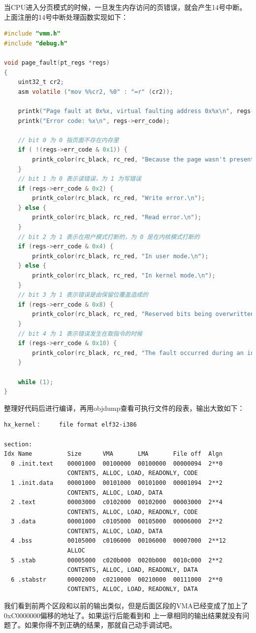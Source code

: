 \par 当CPU进入分页模式的时候，一旦发生内存访问的页错误，就会产生14号中断。上面注册的14号中断处理函数实现如下：

\begin{lstlisting}[language = C, caption = mm/page\_fault.c]
#include "vmm.h"
#include "debug.h"

void page_fault(pt_regs *regs)
{
	uint32_t cr2;
	asm volatile ("mov %%cr2, %0" : "=r" (cr2));

	printk("Page fault at 0x%x, virtual faulting address 0x%x\n", regs->eip, cr2);
	printk("Error code: %x\n", regs->err_code);

	// bit 0 为 0 指页面不存在内存里
	if ( !(regs->err_code & 0x1)) {
		printk_color(rc_black, rc_red, "Because the page wasn't present.\n");
	}
	// bit 1 为 0 表示读错误，为 1 为写错误
	if (regs->err_code & 0x2) {
		printk_color(rc_black, rc_red, "Write error.\n");
	} else {
		printk_color(rc_black, rc_red, "Read error.\n");
	}
	// bit 2 为 1 表示在用户模式打断的，为 0 是在内核模式打断的
	if (regs->err_code & 0x4) {
		printk_color(rc_black, rc_red, "In user mode.\n");
	} else {
		printk_color(rc_black, rc_red, "In kernel mode.\n");
	}
	// bit 3 为 1 表示错误是由保留位覆盖造成的
	if (regs->err_code & 0x8) {
		printk_color(rc_black, rc_red, "Reserved bits being overwritten.\n");
	}
	// bit 4 为 1 表示错误发生在取指令的时候
	if (regs->err_code & 0x10) {
		printk_color(rc_black, rc_red, "The fault occurred during an instruction fetch.\n");
	}

	while (1);
}
\end{lstlisting}

\par 整理好代码后进行编译，再用objdump查看可执行文件的段表，输出大致如下：

\begin{Verbatim}[frame=single]
hx_kernel：     file format elf32-i386

section:
Idx Name          Size      VMA       LMA       File off  Algn
  0 .init.text    00001000  00100000  00100000  00000094  2**0
                  CONTENTS, ALLOC, LOAD, READONLY, CODE
  1 .init.data    00001000  00101000  00101000  00001094  2**2
                  CONTENTS, ALLOC, LOAD, DATA
  2 .text         00003000  c0102000  00102000  00003000  2**4
                  CONTENTS, ALLOC, LOAD, READONLY, CODE
  3 .data         00001000  c0105000  00105000  00006000  2**2
                  CONTENTS, ALLOC, LOAD, DATA
  4 .bss          00105000  c0106000  00106000  00007000  2**12
                  ALLOC
  5 .stab         00005000  c020b000  0020b000  0010c000  2**2
                  CONTENTS, ALLOC, LOAD, READONLY, DATA
  6 .stabstr      00002000  c0210000  00210000  00111000  2**0
                  CONTENTS, ALLOC, LOAD, READONLY, DATA
\end{Verbatim}

\par 我们看到前两个区段和以前的输出类似，但是后面区段的VMA已经变成了加上了0xC0000000偏移的地址了。如果运行后能看到和\allowbreak
上一章相同的输出结果就没有问题了。如果你得不到正确的结果，那就自己动手调试吧。

